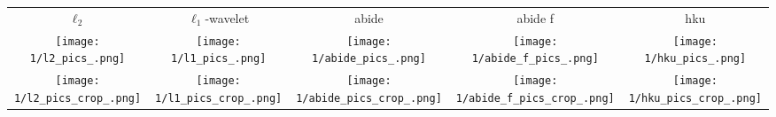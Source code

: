 \begin{tabular}{c @{\hskip 0pt} c @{\hskip 0pt} c @{\hskip 0pt} c @{\hskip 0pt} c}
    $\ell_2$& $\ell_1$-wavelet & abide & abide f & hku \\
    \texttt{[image: 1/l2\_pics\_.png]}&
    \texttt{[image: 1/l1\_pics\_.png]}&
    \texttt{[image: 1/abide\_pics\_.png]}&
    \texttt{[image: 1/abide\_f\_pics\_.png]}&
    \texttt{[image: 1/hku\_pics\_.png]}\\
    \texttt{[image: 1/l2\_pics\_crop\_.png]}&
    \texttt{[image: 1/l1\_pics\_crop\_.png]}&
    \texttt{[image: 1/abide\_pics\_crop\_.png]}&
    \texttt{[image: 1/abide\_f\_pics\_crop\_.png]}&
    \texttt{[image: 1/hku\_pics\_crop\_.png]}
\end{tabular}